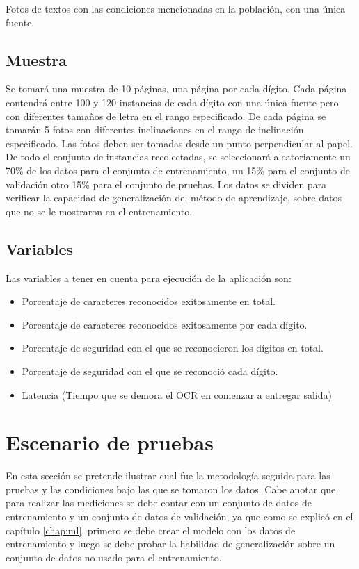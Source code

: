 \documentclass[a4paper, 11pt, oneside]{report}
\begin{document}
Fotos de textos con las condiciones mencionadas en la población, con una única fuente.

\subsection{Muestra}

Se tomará una muestra de 10 páginas, una página por cada dígito. Cada página contendrá entre 100 y 120 instancias de cada dígito con una única fuente pero con diferentes tamaños de letra en el rango especificado. De cada página se tomarán 5 fotos con diferentes inclinaciones en el rango de inclinación especificado. Las fotos deben ser tomadas desde un punto perpendicular al papel. De todo el conjunto de instancias recolectadas, se seleccionará aleatoriamente un 70\% de los datos para el conjunto de entrenamiento, un 15\% para el conjunto de validación otro 15\% para el conjunto de pruebas. Los datos se dividen para verificar la capacidad de generalización del método de aprendizaje, sobre datos que no se le mostraron en el entrenamiento.

\subsection{Variables}

Las variables a tener en cuenta para ejecución de la aplicación son:
\begin{itemize}
\item Porcentaje de caracteres reconocidos exitosamente en total.
\item Porcentaje de caracteres reconocidos exitosamente por cada dígito.
\item Porcentaje de seguridad con el que se reconocieron los dígitos en total.
\item Porcentaje de seguridad con el que se reconoció cada dígito.
\item Latencia (Tiempo que se demora el OCR en comenzar a entregar salida)
\end{itemize}

\section{Escenario de pruebas}
\label{sect:testEnvironment}

En esta sección se pretende ilustrar cual fue la metodología seguida para las pruebas y las condiciones bajo las que se tomaron los datos. Cabe anotar que para realizar las mediciones se debe contar con un conjunto de datos de entrenamiento y un conjunto de datos de validación, ya que como se explicó en el capítulo \ref{chap:ml}, primero se debe crear el modelo con los datos de entrenamiento y luego se debe probar la habilidad de generalización sobre un conjunto de datos no usado para el entrenamiento.
\end{document}
